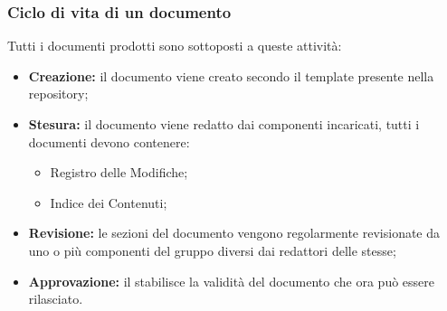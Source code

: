 \subsubsection{Ciclo di vita di un documento}
Tutti i documenti prodotti sono sottoposti a queste attività:
\begin{itemize}
	\item \textbf{Creazione: }il documento viene creato secondo il template presente nella repository;
	\item \textbf{Stesura: }il documento viene redatto dai componenti incaricati, tutti i documenti devono contenere:
	\begin{itemize}
		\item Registro delle Modifiche;
		\item Indice dei Contenuti;
	\end{itemize}
	\item \textbf{Revisione: }le sezioni del documento vengono regolarmente revisionate da uno o più componenti del gruppo diversi dai redattori delle stesse;
	\item \textbf{Approvazione: }il \Responsabile stabilisce la validità del documento che ora può essere rilasciato. 
\end{itemize}

